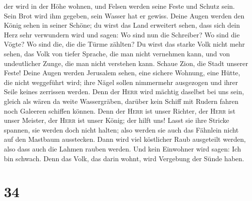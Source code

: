 der wird in der Höhe wohnen, und Felsen werden seine Feste und Schutz
sein. Sein Brot wird ihm gegeben, sein Wasser hat er gewiss.
 Deine Augen werden den König sehen in seiner Schöne; du
wirst das Land erweitert sehen,  dass sich dein Herz sehr
verwundern wird und sagen: Wo sind nun die Schreiber? Wo sind die Vögte?
Wo sind die, die die Türme zählten?  Du wirst das starke
Volk nicht mehr sehen, das Volk von tiefer Sprache, die man nicht
vernehmen kann, und von undeutlicher Zunge, die man nicht verstehen
kann.  Schaue Zion, die Stadt unserer Feste! Deine Augen
werden Jerusalem sehen, eine sichere Wohnung, eine Hütte, die nicht
weggeführt wird; ihre Nägel sollen nimmermehr ausgezogen und ihrer Seile
keines zerrissen werden.  Denn der \textsc{Herr} wird
mächtig daselbst bei uns sein, gleich als wären da weite Wassergräben,
darüber kein Schiff mit Rudern fahren noch Galeeren schiffen können.
 Denn der \textsc{Herr} ist unser Richter, der
\textsc{Herr} ist unser Meister, der \textsc{Herr} ist unser König; der
hilft uns!  Lasst sie ihre Stricke spannen, sie werden
doch nicht halten; also werden sie auch das Fähnlein nicht auf den
Mastbaum ausstecken. Dann wird viel köstlicher Raub ausgeteilt werden,
also dass auch die Lahmen rauben werden.  Und kein
Einwohner wird sagen: Ich bin schwach. Denn das Volk, das darin wohnt,
wird Vergebung der Sünde haben.

\hypertarget{section-33}{%
\section{34}\label{section-33}}

